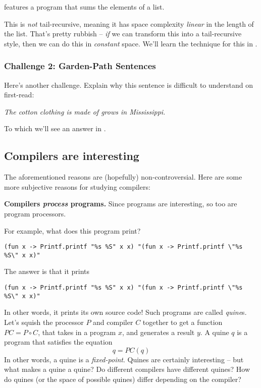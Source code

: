 features a program that sums the elements of a list.

This is \emph{not} tail-recursive, meaning it has space complexity \emph{linear} in the length of the list. That's pretty rubbish -- \emph{if} we can transform this into a tail-recursive style, then we can do this in \emph{constant} space. We'll learn the technique for this in .

\subsubsection{Challenge 2: Garden-Path Sentences}\label{section:challenge-2}
Here's another challenge. Explain why this sentence is difficult to understand on first-read:

\begin{center}
    \textit{The cotton clothing is made of grows in Mississippi.}
\end{center}

To which we'll see an answer in .

\subsection{Compilers are interesting}
The aforementioned reasons are (hopefully) non-controversial. Here are some more subjective reasons for studying compilers:

\textbf{Compilers \emph{process} programs.} Since programs are interesting, so too are program processors.

For example, what does this program \cite{drup-2018} print?

\begin{code}
\begin{verbatim}
(fun x -> Printf.printf "%s %S" x x) "(fun x -> Printf.printf \"%s %S\" x x)"
\end{verbatim}
\end{code}

The answer is that it prints 

{
\verb|(fun x -> Printf.printf "%s %S" x x) "(fun x -> Printf.printf \"%s %S\" x x)"|
}

In other words, it prints its own source code! Such programs are called \emph{quine}s. Let's squish the processor $P$ and compiler $C$ together to get a function $PC = P \circ C$, that takes in a program $x$, and generates a result $y$. A quine $q$ is a program that satisfies the equation
\[q = PC(q)\]
In other words, a quine is a \emph{fixed-point}. Quines are certainly interesting -- but what makes a quine a quine? Do different compilers have different quines? How do quines (or the space of possible quines) differ depending on the compiler?

